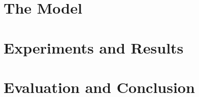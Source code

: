 \documentclass[b5paper, twoside, titlepage, 10pt]{report}
\begin{document}
\chapter{The Model}
\label{theModel}




\chapter{Experiments and Results}
\label{experimentsAndResults}










\chapter{Evaluation and Conclusion}
\label{evaluationAndConclusion}






\cleardoublepage





\clearpage

\begin{appendices}


\end{appendices}
\end{document}
